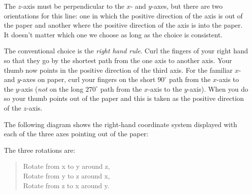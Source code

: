 \documentclass[11pt,a4paper]{report}
\begin{document}
The $z$-axis must be perpendicular to the $x$- and $y$-axes, but there are two orientations for this line: one in which the positive direction of the axis is out of the paper and another where the positive direction of the axis is into the paper. It doesn't matter which one we choose as long as the choice is consistent.

The conventional choice is the \emph{right hand rule}. Curl the fingers of your right hand so that they go by the shortest path from the one axis to another axis. Your thumb now points in the positive direction of the third axis. For the familiar $x$- and $y$-axes on paper, curl your fingers on the short $90^\circ$ path from the $x$-axis to the $y$-axis (\emph{not} on the long $270^\circ$ path from the $x$-axis to the $y$-axis). When you do so your thumb points out of the paper and this is taken as the positive direction of the $z$-axis.

The following diagram shows the right-hand coordinate system displayed with each of the three axes pointing out of the paper:
\begin{center}
\hspace{2em}
\hspace{2em}
\end{center}

The three rotations are:
\begin{quote}
\normalsize
Rotate from x to y around z,\\
Rotate from y to z around x,\\
Rotate from z to x around y.
\end{quote}
\end{document}
